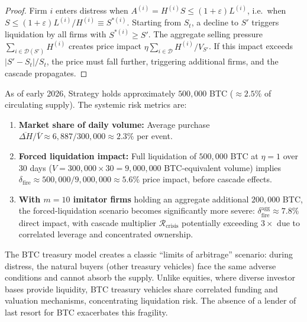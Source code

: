 \begin{proof}
Firm $i$ enters distress when $A^{(i)} = H^{(i)} S \le
(1+\varepsilon) L^{(i)}$, i.e.\ when
$S \le (1+\varepsilon) L^{(i)} / H^{(i)} \equiv S^{*(i)}$.
Starting from $S_t$, a decline to $S'$ triggers liquidation by all
firms with $S^{*(i)} \ge S'$.  The aggregate selling pressure
$\sum_{i \in \mathcal{D}(S')} H^{(i)}$ creates price impact
$\eta \sum_{i \in \mathcal{D}} H^{(i)} / V_{S'}$.  If this impact
exceeds $|S' - S_t|/S_t$, the price must fall further, triggering
additional firms, and the cascade propagates.
\end{proof}

\begin{proposition}\label{prop:footprint}
As of early 2026, Strategy holds approximately $500{,}000$ BTC
($\approx 2.5\%$ of circulating supply).  The systemic risk metrics are:
\begin{enumerate}
  \item \textbf{Market share of daily volume:}
    Average purchase $\overline{\Delta H} / \bar{V}
    \approx 6{,}887 / 300{,}000 \approx 2.3\%$ per event.
  \item \textbf{Forced liquidation impact:}
    Full liquidation of $500{,}000$ BTC at $\eta = 1$ over 30 days
    ($V = 300{,}000 \times 30 = 9{,}000{,}000$ BTC-equivalent volume)
    implies $\delta_{\mathrm{fire}} \approx 500{,}000 / 9{,}000{,}000
    \approx 5.6\%$ price impact, before cascade effects.
  \item \textbf{With $m = 10$ imitator firms} holding an aggregate
    additional $200{,}000$ BTC, the forced-liquidation scenario
    becomes significantly more severe:
    $\delta_{\mathrm{fire}}^{\mathrm{agg}} \approx 7.8\%$ direct impact,
    with cascade multiplier $\mathcal{R}_{\mathrm{crisis}}$ potentially
    exceeding $3\times$ due to correlated leverage and concentrated
    ownership.
\end{enumerate}
\end{proposition}

\begin{remark}
The BTC treasury model creates a classic
\citet{shleifer1997limits} ``limits of arbitrage'' scenario: during
distress, the natural buyers (other treasury vehicles) face the same
adverse conditions and cannot absorb the supply.  Unlike equities, where
diverse investor bases provide liquidity, BTC treasury vehicles share
correlated funding and valuation mechanisms, concentrating liquidation
risk.  The absence of a lender of last resort for BTC exacerbates this
fragility.
\end{remark}

